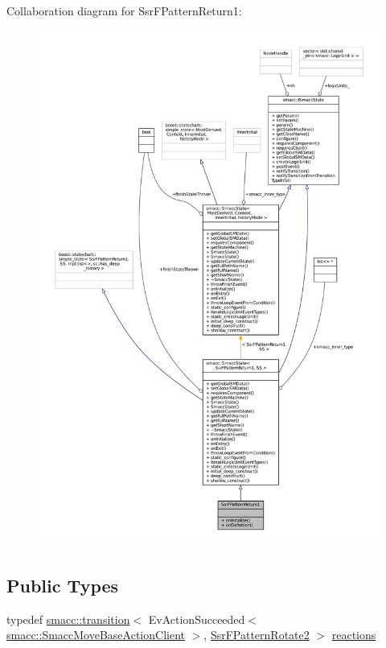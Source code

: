 Collaboration diagram for Ssr\+F\+Pattern\+Return1\+:
\nopagebreak
\begin{figure}[H]
\begin{center}
\leavevmode
\includegraphics[width=350pt]{structSsrFPatternReturn1__coll__graph}
\end{center}
\end{figure}
\subsection*{Public Types}
\begin{DoxyCompactItemize}
\item 
typedef \hyperlink{classsmacc_1_1transition}{smacc\+::transition}$<$ Ev\+Action\+Succeeded$<$ \hyperlink{classsmacc_1_1SmaccMoveBaseActionClient}{smacc\+::\+Smacc\+Move\+Base\+Action\+Client} $>$, \hyperlink{structSsrFPatternRotate2}{Ssr\+F\+Pattern\+Rotate2} $>$ \hyperlink{structSsrFPatternReturn1_a8880356d06b1fa1aa432952cf3886702}{reactions}
\end{DoxyCompactItemize}
